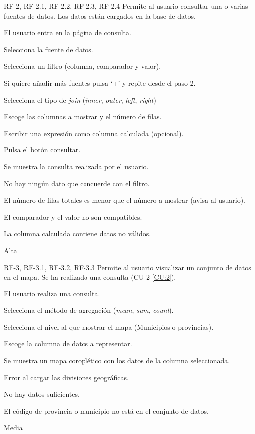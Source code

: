 
{RF-2, RF-2.1, RF-2.2, RF-2.3, RF-2.4}
{Permite al usuario consultar una o varias fuentes de datos.}
{Los datos están cargados en la base de datos.}
{
	\item El usuario entra en la página de consulta.
	\item Selecciona la fuente de datos.
	\item Selecciona un filtro (columna, comparador y valor).
	\item Si quiere añadir más fuentes pulsa `+' y repite desde el paso 2.
	\item Selecciona el tipo de \textit{join} (\textit{inner}, \textit{outer}, \textit{left}, \textit{right})
	\item Escoge las columnas a mostrar y el número de filas.
	\item Escribir una expresión como columna calculada (opcional).
	\item Pulsa el botón consultar.
}
{Se muestra la consulta realizada por el usuario.}
{
	\item No hay ningún dato que concuerde con el filtro.
	\item El número de filas totales es menor que el número a mostrar (avisa al usuario).
	\item El comparador y el valor no son compatibles.
	\item La columna calculada contiene datos no válidos.
}
{Alta}


{RF-3, RF-3.1, RF-3.2, RF-3.3}
{Permite al usuario visualizar un conjunto de datos en el mapa.}
{Se ha realizado una consulta (CU-2 \ref{CU:2}).}
{
	\item El usuario realiza una consulta.
	\item Selecciona el método de agregación (\textit{mean}, \textit{sum}, \textit{count}).
	\item Selecciona el nivel al que mostrar el mapa (Municipios o provincias).
	\item Escoge la columna de datos a representar.
}
{Se muestra un mapa coroplético con los datos de la columna seleccionada.}
{
	\item Error al cargar las divisiones geográficas.
	\item No hay datos suficientes.
	\item El código de provincia o municipio no está en el conjunto de datos.
}
{Media}

